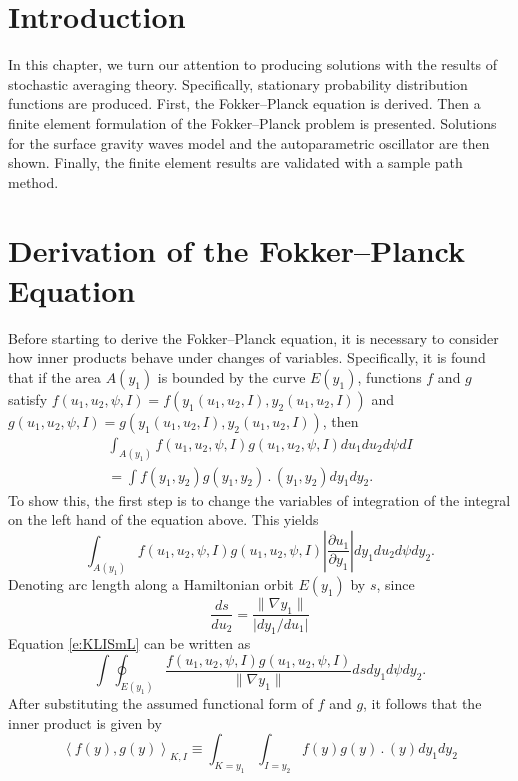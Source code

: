 \section{Introduction}

In this chapter, we turn our attention to producing solutions with the results of stochastic averaging theory. Specifically, stationary probability distribution functions are produced. First, the Fokker--Planck equation is derived. Then a finite element formulation of the Fokker--Planck problem is presented. Solutions for the surface gravity waves model and the autoparametric oscillator are then shown. Finally, the finite element results are validated with a sample path method.

\section{Derivation of the Fokker--Planck Equation}

Before starting to derive the Fokker--Planck equation, it is necessary to consider how inner products behave under changes of variables. Specifically, it is found that if the area $A(y_1)$ is bounded by the curve $E(y_1)$, functions $f$ and $g$ satisfy $f(u_1,u_2,\psi,I) = f(y_1(u_1,u_2,I),y_2(u_1,u_2,I))$ and $g(u_1,u_2,\psi,I) = g(y_1(u_1,u_2,I),y_2(u_1,u_2,I))$, then
\begin{multline*}
\int_{A(y_1)} f(u_1,u_2,\psi,I) g(u_1,u_2,\psi,I) du_1 du_2 d\psi dI\\
= \int f(y_1,y_2) g(y_1, y_2) \period(y_1,y_2) dy_1 dy_2.
\end{multline*}
To show this, the first step is to change the variables of integration of the integral on the left hand of the equation above. This yields
\begin{equation}
\label{e:KLISmL}
\int_{A(y_1)} f(u_1,u_2,\psi,I) g(u_1,u_2,\psi,I) \left\lvert\frac{\partial u_1}{\partial y_1}\right\rvert dy_1 du_2 d\psi dy_2.
\end{equation}
Denoting arc length along a Hamiltonian orbit $E(y_1)$ by $s$, since
\[
\frac{ds}{du_2} = \frac{\lVert \nabla y_1 \rVert}{\lvert dy_1/du_1\rvert}
\]
Equation \eqref{e:KLISmL} can be written as
\[
\int \oint_{E(y_1)} \frac{f(u_1,u_2,\psi,I) g(u_1,u_2,\psi,I)}{\lVert \nabla y_1 \rVert} ds dy_1 d\psi dy_2.
\]
After substituting the assumed functional form of $f$ and $g$, it follows that the inner product is given by
\[
\left\langle f(y), g(y) \right\rangle_{K,I} \equiv \int_{K=y_1} \int_{I=y_2} f(y) g(y) \period (y) dy_1 dy_2
\]


